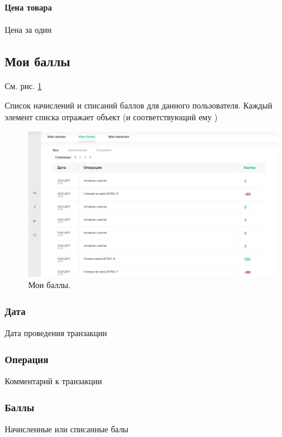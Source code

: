                 \paragraph{Цена товара}

                    \par{
                    Цена за один 
                    }
                    
        \subsection{Мои баллы}

            См. рис. \ref{fig:auth_my_points}

            Список начислений и списаний баллов для данного пользователя. Каждый
            элемент списка отражает объект  (и соответствующий
            ему )

            \begin{figure}
                \center
                \includegraphics[width=120mm]{04_auth_funcs/figures/14.eps}
                \caption{Мои баллы.}
                \label{fig:auth_my_points}
            \end{figure}
        
            \subsubsection{Дата}
                Дата проведения транзакции
            \subsubsection{Операция}
                Комментарий к транзакции 
            \subsubsection{Баллы}
                Начисленные или списанные балы

